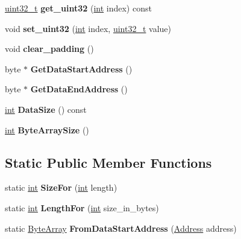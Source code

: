 \begin{DoxyCompactItemize}
\mbox{\hyperlink{classuint32__t}{uint32\+\_\+t}} {\bfseries get\+\_\+uint32} (\mbox{\hyperlink{classint}{int}} index) const
\item 
\mbox{\label{classv8_1_1internal_1_1ByteArray_ae097069002d31bff187007d1bcf1daf6}} 
void {\bfseries set\+\_\+uint32} (\mbox{\hyperlink{classint}{int}} index, \mbox{\hyperlink{classuint32__t}{uint32\+\_\+t}} value)
\item 
\mbox{\label{classv8_1_1internal_1_1ByteArray_aab7bbb12d1daed2c02a2e876b7f4944b}} 
void {\bfseries clear\+\_\+padding} ()
\item 
\mbox{\label{classv8_1_1internal_1_1ByteArray_a4d48ac4f8568b365e2aedad1c2b86a72}} 
byte $\ast$ {\bfseries Get\+Data\+Start\+Address} ()
\item 
\mbox{\label{classv8_1_1internal_1_1ByteArray_a9ea5ab60121797ee1e026bff19f9c88d}} 
byte $\ast$ {\bfseries Get\+Data\+End\+Address} ()
\item 
\mbox{\label{classv8_1_1internal_1_1ByteArray_a9d9b9e47e65f89f063e5a47617ccf91d}} 
\mbox{\hyperlink{classint}{int}} {\bfseries Data\+Size} () const
\item 
\mbox{\label{classv8_1_1internal_1_1ByteArray_a64c9a5f6345c629889a3ddc101514e2a}} 
\mbox{\hyperlink{classint}{int}} {\bfseries Byte\+Array\+Size} ()
\end{DoxyCompactItemize}
\subsection*{Static Public Member Functions}
\begin{DoxyCompactItemize}
\item 
\mbox{\label{classv8_1_1internal_1_1ByteArray_a0b2f58c92d17d1f72c82bf1116f79c62}} 
static \mbox{\hyperlink{classint}{int}} {\bfseries Size\+For} (\mbox{\hyperlink{classint}{int}} length)
\item 
\mbox{\label{classv8_1_1internal_1_1ByteArray_a59dfeddc28a37ee47271562bdfa3f97b}} 
static \mbox{\hyperlink{classint}{int}} {\bfseries Length\+For} (\mbox{\hyperlink{classint}{int}} size\+\_\+in\+\_\+bytes)
\item 
\mbox{\label{classv8_1_1internal_1_1ByteArray_a3ae568292e0a2e2af40db9c3f6ad2189}} 
static \mbox{\hyperlink{classv8_1_1internal_1_1ByteArray}{Byte\+Array}} {\bfseries From\+Data\+Start\+Address} (\mbox{\hyperlink{classuintptr__t}{Address}} address)
\end{DoxyCompactItemize}
